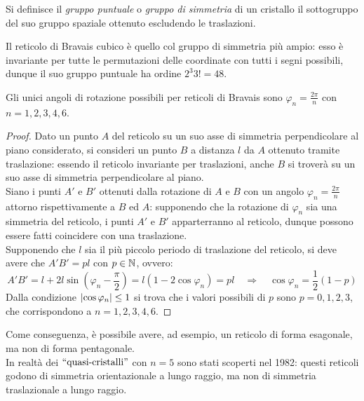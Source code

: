 \begin{definition}
	Si definisce il \textit{gruppo puntuale} o \textit{gruppo di simmetria} di un cristallo il sottogruppo del suo gruppo spaziale ottenuto escludendo le traslazioni.
\end{definition}

\begin{example}
	Il reticolo di Bravais cubico è quello col gruppo di simmetria più ampio: esso è invariante per tutte le permutazioni delle coordinate con tutti i segni possibili, dunque il suo gruppo puntuale ha ordine $ 2^3 3! = 48 $.
\end{example}

\begin{theorem}
	Gli unici angoli di rotazione possibili per reticoli di Bravais sono $ \varphi_n = \frac{2\pi}{n} $ con $ n = 1,2,3,4,6 $.
\end{theorem}
\begin{proof}
	Dato un punto $ A $ del reticolo su un suo asse di simmetria perpendicolare al piano considerato, si consideri un punto $ B $ a distanza $ l $ da $ A $ ottenuto tramite traslazione: essendo il reticolo invariante per traslazioni, anche $ B $ si troverà su un suo asse di simmetria perpendicolare al piano.\\
	Siano i punti $ A' $ e $ B' $ ottenuti dalla rotazione di $ A $ e $ B $ con un angolo $ \varphi_n = \frac{2\pi}{n} $ attorno rispettivamente a $ B $ ed $ A $: supponendo che la rotazione di $ \varphi_n $ sia una simmetria del reticolo, i punti $ A' $ e $ B' $ apparterranno al reticolo, dunque possono essere fatti coincidere con una traslazione.\\
	Supponendo che $ l $ sia il più piccolo periodo di traslazione del reticolo, si deve avere che $ A'B' = pl $ con $ p \in \mathbb{N} $, ovvero:
	\begin{equation*}
		A'B' = l + 2l \sin \left( \varphi_n - \frac{\pi}{2} \right) = l \left( 1 - 2 \cos \varphi_n \right) = p l \quad \Rightarrow \quad \cos \varphi_n = \frac{1}{2} (1 - p)
	\end{equation*}
	Dalla condizione $ \left\lvert\cos \varphi_n\right\rvert \le 1 $ si trova che i valori possibili di $ p $ sono $ p = 0,1,2,3 $, che corrispondono a $ n = 1,2,3,4,6 $.
\end{proof}

Come conseguenza, è possibile avere, ad esempio, un reticolo di forma esagonale, ma non di forma pentagonale.\\
In realtà dei $ ``\text{quasi-cristalli}" $ con $ n = 5 $ sono stati scoperti nel 1982: questi reticoli godono di simmetria orientazionale a lungo raggio, ma non di simmetria traslazionale a lungo raggio.

